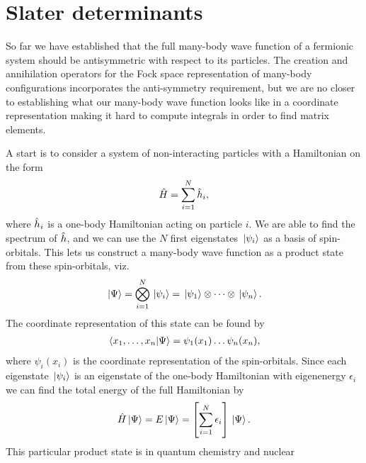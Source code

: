     \section{Slater determinants}
        \label{sec:slater-determinants}
        So far we have established that the full many-body wave function of a
        fermionic system should be antisymmetric with respect to its particles.
        The creation and annihilation operators for the Fock space
        representation of many-body configurations incorporates the
        anti-symmetry requirement, but we are no closer to establishing what our
        many-body wave function looks like in a coordinate representation making
        it hard to compute integrals in order to find matrix elements.

        A start is to consider a system of non-interacting particles with a
        Hamiltonian on the form
        \begin{align}
            \hat{H} = \sum_{i = 1}^{N} \hat{h}_i,
        \end{align}
        where $\hat{h}_i$ is a one-body Hamiltonian acting on particle $i$. We
        are able to find the spectrum of $\hat{h}$, and we can use the $N$
        first eigenstates $\ket*{\psi_i}$ as a basis of spin-orbitals.
        This lets us construct a many-body wave function as a product state from
        these spin-orbitals, viz.
        \begin{align}
            \ket*{\Psi}
            = \bigotimes_{i = 1}^{N}\ket*{\psi_i}
            = \ket*{\psi_1}\otimes\dots\otimes\ket*{\psi_n}.
        \end{align}
        The coordinate representation of this state can be found by
        \begin{align}
            \braket*{x_1, \dots, x_n}{\Psi}
            = \psi_1(x_1)\dots\psi_n(x_n),
        \end{align}
        where $\psi_i(x_i)$ is the coordinate representation of the
        spin-orbitals.
        Since each eigenstate $\ket*{\psi_i}$ is an eigenstate of the one-body
        Hamiltonian with eigenenergy $\epsilon_i$ we can find the total energy
        of the full Hamiltonian by
        \begin{align}
            \hat{H}\ket*{\Psi}
            = E\ket*{\Psi}
            = \left[ 
                \sum_{i = 1}^{N}
                \epsilon_i
             \right]\ket*{\Psi}.
        \end{align}
        This particular product state is in quantum chemistry and nuclear
